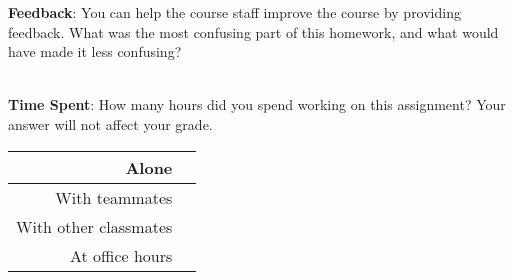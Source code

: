 \documentclass[12pt]{article}
\begin{document}
\textbf{Feedback}: You can help the course staff improve the course by providing feedback. What was the most confusing part of this homework, and what would have made it less confusing?

\begin{tcolorbox}[fit,height=10em, width=40em, blank, borderline={1pt}{1pt},nobeforeafter]
            \begin{center}
            \end{center}
            \end{tcolorbox}\\

\noindent\textbf{Time Spent}: How many hours did you spend working on this assignment? Your answer will not affect your grade.

\begin{tcolorbox}[fit,height=10em, width=40em, blank, borderline={1pt}{1pt},nobeforeafter]
\begin{table}[H]
    \centering
    \begin{tabular}{r|c}
        Alone &  \hspace{3em} %
        \\ \hline
        With teammates & \hspace{3em} %
        \\ \hline
        With other classmates & \hspace{3em} %
        \\ \hline
        At office hours & \hspace{3em} %
        \\ \hline
    \end{tabular}
\end{table}
\end{tcolorbox}
\end{document}
